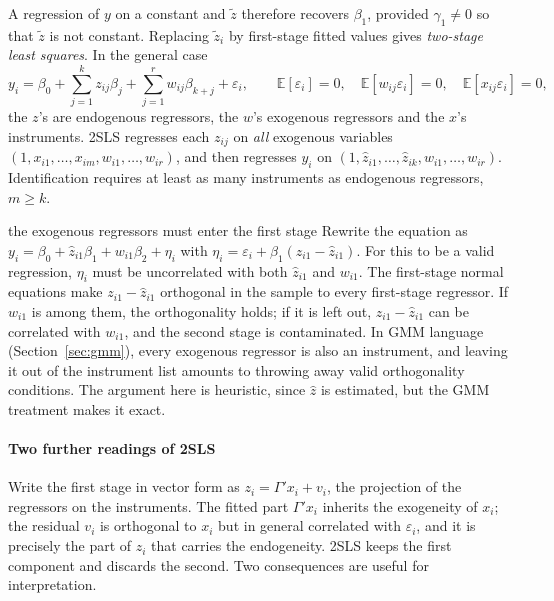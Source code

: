\documentclass[11pt,a4paper]{article}
\newcommand{\E}{\mathbb{E}}
\begin{document}
A regression of $y$ on a constant and $\tilde z$ therefore recovers $\beta_1$, provided $\gamma_1\neq0$ so that $\tilde z$ is not constant. Replacing $\tilde z_i$ by first-stage fitted values gives \emph{two-stage least squares}. In the general case
\[
y_i=\beta_0+\sum_{j=1}^kz_{ij}\beta_j+\sum_{j=1}^rw_{ij}\beta_{k+j}+\varepsilon_i,
\qquad\E[\varepsilon_i]=0,\quad\E[w_{ij}\varepsilon_i]=0,\quad\E[x_{ij}\varepsilon_i]=0,
\]
the $z$'s are endogenous regressors, the $w$'s exogenous regressors and the $x$'s instruments. 2SLS regresses each $z_{ij}$ on \emph{all} exogenous variables $(1,x_{i1},\dots,x_{im},w_{i1},\dots,w_{ir})$, and then regresses $y_i$ on $(1,\hat z_{i1},\dots,\hat z_{ik},w_{i1},\dots,w_{ir})$. Identification requires at least as many instruments as endogenous regressors, $m\geq k$.

\begin{whybox}{the exogenous regressors must enter the first stage}
Rewrite the equation as $y_i=\beta_0+\hat z_{i1}\beta_1+w_{i1}\beta_2+\eta_i$ with $\eta_i=\varepsilon_i+\beta_1(z_{i1}-\hat z_{i1})$. For this to be a valid regression, $\eta_i$ must be uncorrelated with both $\hat z_{i1}$ and $w_{i1}$. The first-stage normal equations make $z_{i1}-\hat z_{i1}$ orthogonal in the sample to every first-stage regressor. If $w_{i1}$ is among them, the orthogonality holds; if it is left out, $z_{i1}-\hat z_{i1}$ can be correlated with $w_{i1}$, and the second stage is contaminated. In GMM language (Section~\ref{sec:gmm}), every exogenous regressor is also an instrument, and leaving it out of the instrument list amounts to throwing away valid orthogonality conditions. The argument here is heuristic, since $\hat z$ is estimated, but the GMM treatment makes it exact.
\end{whybox}

\paragraph{Two further readings of 2SLS}
Write the first stage in vector form as $z_i=\Gamma'x_i+v_i$, the projection of the regressors on the instruments. The fitted part $\Gamma'x_i$ inherits the exogeneity of $x_i$; the residual $v_i$ is orthogonal to $x_i$ but in general correlated with $\varepsilon_i$, and it is precisely the part of $z_i$ that carries the endogeneity. 2SLS keeps the first component and discards the second. Two consequences are useful for interpretation.
\end{document}
